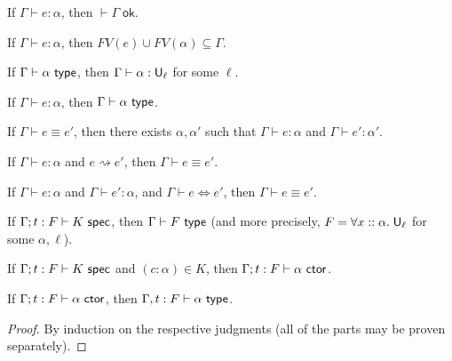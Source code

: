 \begin{lemma}[Regularity]\label{thm:reg}
\begin{thmlist}
\item If $\Gamma\vdash e:\alpha$, then $\vdash\Gamma\;\mathsf{ok}$.
\item If $\Gamma\vdash e:\alpha$, then $FV(e)\cup FV(\alpha)\subseteq\Gamma$.
\item If $\Gamma\vdash\alpha\type$, then $\Gamma\vdash\alpha:\U_\ell$ for some $\ell$.
\item If $\Gamma\vdash e:\alpha$, then $\Gamma\vdash\alpha\type$.
\item\label{item:defeq_reg2} If $\Gamma\vdash e\equiv e'$, then there exists $\alpha,\alpha'$ such that $\Gamma\vdash e:\alpha$ and $\Gamma\vdash e':\alpha'$.
\item If $\Gamma\vdash e:\alpha$ and $e\rightsquigarrow e'$, then $\Gamma\vdash e\equiv e'$.
\item\label{item:alg_defn} If $\Gamma\vdash e:\alpha$ and $\Gamma\vdash e':\alpha$, and $\Gamma\vdash e\Leftrightarrow e'$, then $\Gamma\vdash e\equiv e'$.
\item If $\Gamma;t:F\vdash K\spec$, then $\Gamma\vdash F\type$ (and more precisely, $F=\forall x::\alpha.\;\mathsf{U}_\ell$ for some $\alpha,\ell$).
\item If $\Gamma;t:F\vdash K\spec$ and $(c:\alpha)\in K$, then $\Gamma;t:F\vdash\alpha\ctor$.
\item If $\Gamma;t:F\vdash \alpha\ctor$, then $\Gamma,t:F\vdash\alpha\type$.
\end{thmlist}
\end{lemma}
\begin{proof}
By induction on the respective judgments (all of the parts may be proven separately).
\end{proof}

